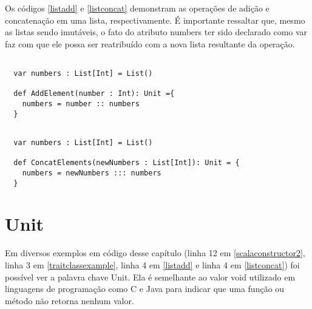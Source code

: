 Os códigos \ref{listadd} e \ref{listconcat} demonstram 
as operações de adição e concatenação em uma lista, 
respectivamente. É importante ressaltar que, mesmo 
as listas sendo imutáveis, o fato do 
atributo numbers ter sido declarado como var 
faz com que ele possa ser reatribuído com a nova lista 
resultante da operação.

\begin{lstlisting}[caption={Exemplo de adição em uma lista imutável},label=listadd]

  var numbers : List[Int] = List()
  
  def AddElement(number : Int): Unit ={
    numbers = number :: numbers
  }

\end{lstlisting}

\begin{lstlisting}[caption={Exemplo de concatenação em uma lista imutável},label=listconcat]

  var numbers : List[Int] = List()
  
  def ConcatElements(newNumbers : List[Int]): Unit = {
    numbers = newNumbers ::: numbers
  }    

\end{lstlisting}

\section{Unit}

Em diversos exemplos em código desse capítulo 
(linha 12 em \ref{scalaconstructor2}, linha 3 em 
\ref{traitclassexample}, linha 4 em 
\ref{listadd} e linha 4 em \ref{listconcat}) 
foi possível ver a palavra chave Unit. Ela é semelhante ao 
valor void utilizado em linguagens de programação como C e 
Java para indicar que uma função ou método não retorna 
nenhum valor\cite{wampler2021}.